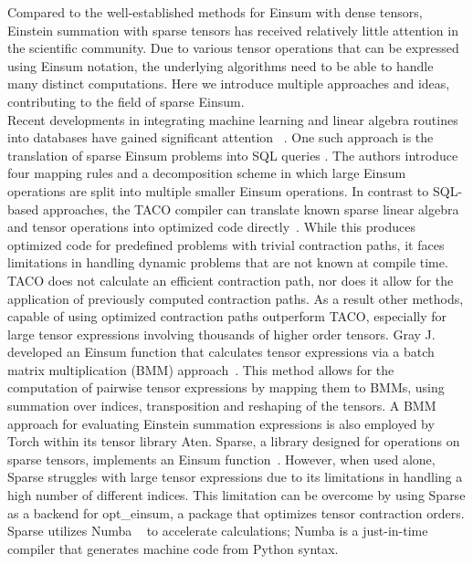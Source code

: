 
\noindent
Compared to the well-established methods for Einsum with dense tensors, Einstein summation with
sparse tensors has received relatively little attention in the scientific community.
Due to various tensor operations that can be expressed using Einsum notation, the
underlying algorithms need to be able to handle many distinct computations. Here we
introduce multiple approaches and ideas, contributing to the field of sparse Einsum.\\
Recent developments in integrating machine learning and linear algebra routines into
databases have gained significant attention
~\cite{Machine_Learning_LinA_and_More, du2020inmachinelearningdatabasereimaginingdeep,
       data_management_in_machine_learning, deepdive}.
One such approach is the translation of sparse Einsum problems into SQL queries
\cite{sql_einsum}. The authors introduce four mapping rules and a decomposition scheme
in which large Einsum operations are split into multiple smaller Einsum operations.
In contrast to SQL-based approaches, the TACO compiler can translate known sparse linear
algebra and tensor operations into optimized code directly~\cite{taco}. While this produces
optimized code for predefined problems with trivial contraction paths, it faces limitations 
in handling dynamic problems that are not known at compile time. TACO does not calculate
an efficient contraction path, nor does it allow for the application of previously computed
contraction paths. As a result other methods, capable of using optimized contraction paths
outperform TACO, especially for large tensor expressions involving thousands of higher order tensors.
Gray J. developed an Einsum function that calculates tensor expressions via a batch matrix
multiplication (BMM) approach~\cite{jcmgray}. This method allows for the computation of pairwise
tensor expressions by mapping them to BMMs, using summation over indices, transposition
and reshaping of the tensors. A BMM approach for evaluating Einstein summation expressions
is also employed by Torch within its tensor library Aten. Sparse, a library designed for 
operations on sparse tensors, implements an Einsum function~\cite{sparse}. However, when used 
alone, Sparse struggles with large tensor expressions due to its limitations in handling a high 
number of different indices. This limitation can be overcome by using Sparse as a backend for 
opt\_einsum, a package that optimizes tensor contraction orders. Sparse utilizes Numba
~\cite{lam2015numba} to accelerate calculations; Numba is a just-in-time compiler that generates 
machine code from Python syntax.